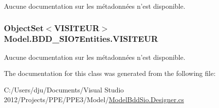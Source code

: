 Aucune documentation sur les métadonnées n'est disponible. 

\hypertarget{class_model_1_1_b_d_d___s_i_o7_entities_a6bea95538ec6b785b1b5bf6e8d9f5efd}{
\subsubsection[{V\-I\-S\-I\-T\-E\-U\-R}]{\setlength{\rightskip}{0pt plus 5cm}Object\-Set$<${\bf V\-I\-S\-I\-T\-E\-U\-R}$>$ Model.\-B\-D\-D\-\_\-\-S\-I\-O7\-Entities.\-V\-I\-S\-I\-T\-E\-U\-R\hspace{0.3cm}{\ttfamily [get]}}}\label{class_model_1_1_b_d_d___s_i_o7_entities_a6bea95538ec6b785b1b5bf6e8d9f5efd}


Aucune documentation sur les métadonnées n'est disponible. 



The documentation for this class was generated from the following file\-:\begin{DoxyCompactItemize}
\item 
C\-:/\-Users/dju/\-Documents/\-Visual Studio 2012/\-Projects/\-P\-P\-E/\-P\-P\-E3/\-Model/\hyperlink{_model_bdd_sio_8_designer_8cs}{Model\-Bdd\-Sio.\-Designer.\-cs}\end{DoxyCompactItemize}
